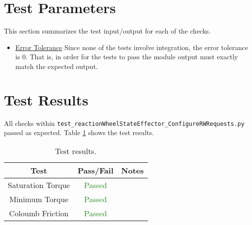 \documentclass[]{BasiliskReportMemo}
\begin{document}
\section{Test Parameters}

This section summarizes the test input/output for each of the checks. 
\begin{itemize}
	\item \underline{Error Tolerance}
	Since none of the tests involve integration, the error tolerance is $0$. That is, in order for the tests to pass the module output must exactly match the expected output.
\end{itemize}


\section{Test Results}

All checks within {\tt test\_reactionWheelStateEffector\_ConfigureRWRequests.py} passed as expected. Table \ref{tab:results} shows the test results.

\begin{table}[htbp]
	\caption{Test results.}
	\label{tab:results}
	\centering \fontsize{10}{10}\selectfont
	\begin{tabular}{c | c | c  } %
		\hline
		\textbf{Test} & \textbf{Pass/Fail} & \textbf{Notes} \\ \hline
		Saturation Torque & \textcolor{ForestGreen}{Passed} & \\ \hline
		Minimum Torque & \textcolor{ForestGreen}{Passed} & \\ \hline
		Coloumb Friction & \textcolor{ForestGreen}{Passed} & \\ \hline
	\end{tabular}
\end{table}
\end{document}
